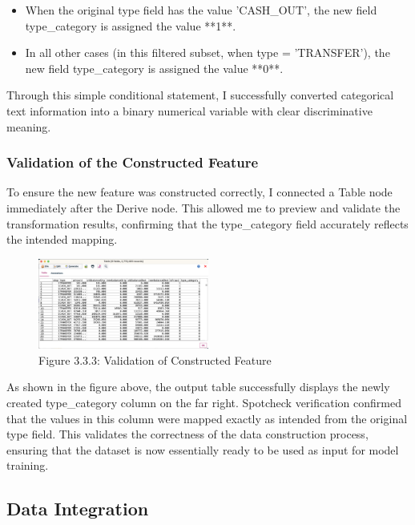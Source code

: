 \documentclass[sigplan,screen]{acmart}
\begin{document}
\begin{itemize}
\item When the original type field has the value 'CASH\_OUT', the new field type\_category is assigned the value **1**.
\item In all other cases (in this filtered subset, when type = 'TRANSFER'), the new field type\_category is assigned the value **0**.
\end{itemize}

Through this simple conditional statement, I successfully converted categorical text information into a binary numerical variable with clear discriminative meaning.

\subsubsection{Validation of the Constructed Feature}

To ensure the new feature was constructed correctly, I connected a Table node immediately after the Derive node. This allowed me to preview and validate the transformation results, confirming that the type\_category field accurately reflects the intended mapping.

\begin{figure}[H]
    \centering
    \includegraphics[width=0.5\textwidth]{3.3.3.png}
    \caption*{Figure 3.3.3: Validation of Constructed Feature}
    \label{fig:3.3.3}
    \label{3.3.3}
\end{figure}

As shown in the figure above, the output table successfully displays the newly created type\_category column on the far right. Spotcheck verification confirmed that the values in this column were mapped exactly as intended from the original type field. This validates the correctness of the data construction process, ensuring that the dataset is now essentially ready to be used as input for model training.

\subsection{Data Integration}
\end{document}
